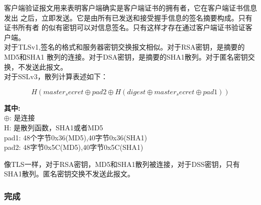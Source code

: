 \documentclass[11pt]{article}
\newcommand{\bfs}[1]{{\bf{#1}}}
\begin{document}
客户端验证报文用来表明客户端确实是客户端证书的拥有者，它在客户端证书信息发出
之后，立即发送。它是由所有已发送和接受握手信息的签名摘要构成。只有证书所有者
的似有密钥可以对信息签名。只有这样才存在通过客户端证书验证客户端。\\

对于TLSv1,签名的格式和服务器密钥交换报文相似。对于RSA密钥，是摘要的MD5和SHA1
散列的连接。对于DSA密钥，是摘要的SHA1散列。对于匿名密钥交换，不发送此报文。\\

对于SSLv3，散列计算表述如下：

$$H(master_secret \oplus pad2 \oplus H(digest \oplus master_secret \oplus
pad1))$$

\begin{center}
\begin{minipage}[t]{0.40\textwidth}
        \bfs{其中:}\\
        $\oplus$: 是连接\\
        H: 是散列函数，SHA1或者MD5\\
        pad1: 48个字节0x36(MD5),40字节0x36(SHA1)\\
        pad2: 48字节0x5C(MD5),40字节0x5C(SHA1)\\
\end{minipage}
\end{center}


像TLS一样，对于RSA密钥，MD5和SHA1散列被连接，对于DSS密钥，只有SHA1散列。匿名密钥交换不发送此报文。\\



\subsubsection{完成}






%
%
%




%
%
% 
%
\end{document}
